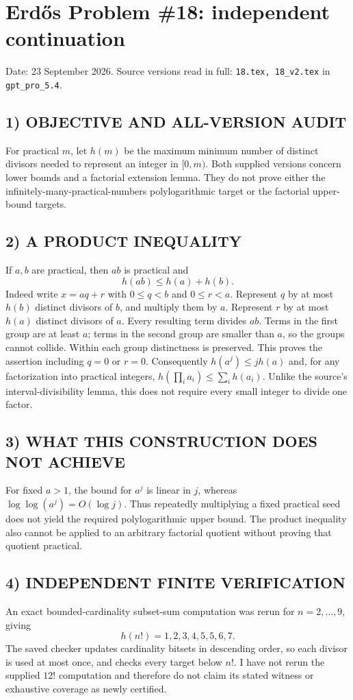 \section{Erd\H{o}s Problem \#18: independent continuation}
\noindent Date: 23 September 2026. Source versions read in full: \texttt{18.tex, 18\_v2.tex} in \texttt{gpt\_pro\_5.4}.

\subsection*{1) OBJECTIVE AND ALL-VERSION AUDIT}
For practical $m$, let $h(m)$ be the maximum minimum number of distinct divisors needed to represent an integer in $[0,m)$. Both supplied versions concern lower bounds and a factorial extension lemma. They do not prove either the infinitely-many-practical-numbers polylogarithmic target or the factorial upper-bound targets.
\subsection*{2) A PRODUCT INEQUALITY}
If $a,b$ are practical, then $ab$ is practical and
\[
\boxed{h(ab)\le h(a)+h(b).}
\]
Indeed write $x=aq+r$ with $0\le q<b$ and $0\le r<a$. Represent $q$ by at most $h(b)$ distinct divisors of $b$, and multiply them by $a$. Represent $r$ by at most $h(a)$ distinct divisors of $a$. Every resulting term divides $ab$. Terms in the first group are at least $a$; terms in the second group are smaller than $a$, so the groups cannot collide. Within each group distinctness is preserved. This proves the assertion including $q=0$ or $r=0$.
Consequently $h(a^j)\le jh(a)$ and, for any factorization into practical integers, $h(\prod_i a_i)\le\sum_i h(a_i)$. Unlike the source's interval-divisibility lemma, this does not require every small integer to divide one factor.
\subsection*{3) WHAT THIS CONSTRUCTION DOES NOT ACHIEVE}
For fixed $a>1$, the bound for $a^j$ is linear in $j$, whereas $\log\log(a^j)=O(\log j)$. Thus repeatedly multiplying a fixed practical seed does not yield the required polylogarithmic upper bound. The product inequality also cannot be applied to an arbitrary factorial quotient without proving that quotient practical.
\subsection*{4) INDEPENDENT FINITE VERIFICATION}
An exact bounded-cardinality subset-sum computation was rerun for $n=2,\ldots,9$, giving
\[
h(n!)=1,2,3,4,5,5,6,7.
\]
The saved checker updates cardinality bitsets in descending order, so each divisor is used at most once, and checks every target below $n!$. I have not rerun the supplied $12!$ computation and therefore do not claim its stated witness or exhaustive coverage as newly certified.
